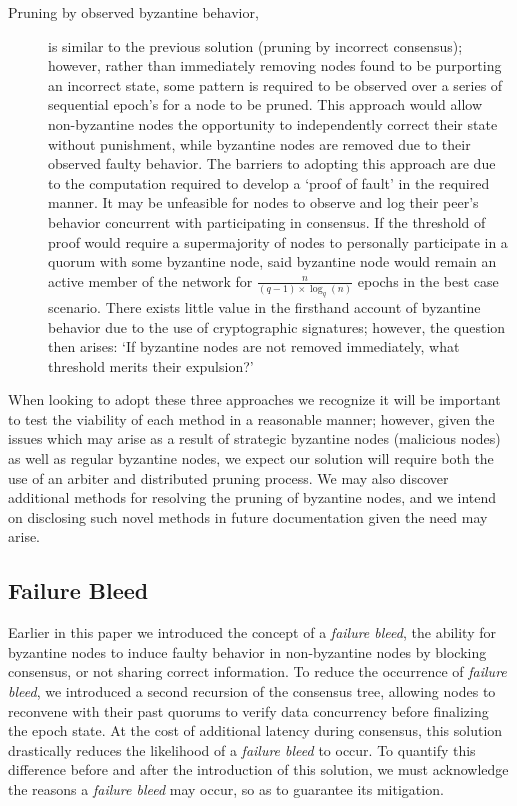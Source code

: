 \begin{description}
\item[Pruning by observed byzantine behavior,] is similar to the previous solution (pruning by incorrect consensus); however, rather than immediately removing nodes found to be purporting an incorrect state, some pattern is required to be observed over a series of sequential epoch’s for a node to be pruned. This approach would allow non-byzantine nodes the opportunity to independently correct their state without punishment, while byzantine nodes are removed due to their observed faulty behavior. The barriers to adopting this approach are due to the computation required to develop a ‘proof of fault’ in the required manner. It may be unfeasible for nodes to observe and log their peer's behavior concurrent with participating in consensus. If the threshold of proof would require a supermajority of nodes to personally participate in a quorum with some byzantine node, said byzantine node would remain an active member of the network for \(\frac{n}{(q-1) \times \log_q(n)}\) epochs in the best case scenario. There exists little value in the firsthand account of byzantine behavior due to the use of cryptographic signatures; however, the question then arises: ‘If byzantine nodes are not removed immediately, what threshold merits their expulsion?’
\end{description}

When looking to adopt these three approaches we recognize it will be important to test the viability of each method in a reasonable manner; however, given the issues which may arise as a result of strategic byzantine nodes (malicious nodes) as well as regular byzantine nodes, we expect our solution will require both the use of an arbiter and distributed pruning process. We may also discover additional methods for resolving the pruning of byzantine nodes, and we intend on disclosing such novel methods in future documentation given the need may arise.

\subsection{Failure Bleed}\label{proj:fb}
Earlier in this paper we introduced the concept of a \textit{failure bleed}, the ability for byzantine nodes to induce faulty behavior in non-byzantine nodes by blocking consensus, or not sharing correct information. To reduce the occurrence of \textit{failure bleed}, we introduced a second recursion of the consensus tree, allowing nodes to reconvene with their past quorums to verify data concurrency before finalizing the epoch state. At the cost of additional latency during consensus, this solution drastically reduces the likelihood of a \textit{failure bleed} to occur. To quantify this difference before and after the introduction of this solution, we must acknowledge the reasons a \textit{failure bleed} may occur, so as to guarantee its mitigation.

